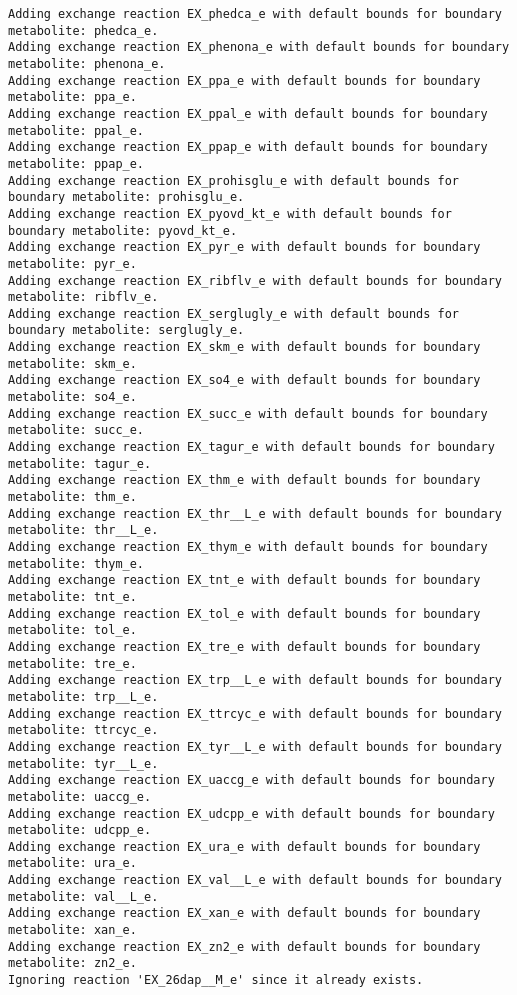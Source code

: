 \documentclass[
  letterpaper,
  DIV=11,
  numbers=noendperiod]{scrartcl}
\begin{document}
\begin{verbatim}
Adding exchange reaction EX_phedca_e with default bounds for boundary metabolite: phedca_e.
Adding exchange reaction EX_phenona_e with default bounds for boundary metabolite: phenona_e.
Adding exchange reaction EX_ppa_e with default bounds for boundary metabolite: ppa_e.
Adding exchange reaction EX_ppal_e with default bounds for boundary metabolite: ppal_e.
Adding exchange reaction EX_ppap_e with default bounds for boundary metabolite: ppap_e.
Adding exchange reaction EX_prohisglu_e with default bounds for boundary metabolite: prohisglu_e.
Adding exchange reaction EX_pyovd_kt_e with default bounds for boundary metabolite: pyovd_kt_e.
Adding exchange reaction EX_pyr_e with default bounds for boundary metabolite: pyr_e.
Adding exchange reaction EX_ribflv_e with default bounds for boundary metabolite: ribflv_e.
Adding exchange reaction EX_serglugly_e with default bounds for boundary metabolite: serglugly_e.
Adding exchange reaction EX_skm_e with default bounds for boundary metabolite: skm_e.
Adding exchange reaction EX_so4_e with default bounds for boundary metabolite: so4_e.
Adding exchange reaction EX_succ_e with default bounds for boundary metabolite: succ_e.
Adding exchange reaction EX_tagur_e with default bounds for boundary metabolite: tagur_e.
Adding exchange reaction EX_thm_e with default bounds for boundary metabolite: thm_e.
Adding exchange reaction EX_thr__L_e with default bounds for boundary metabolite: thr__L_e.
Adding exchange reaction EX_thym_e with default bounds for boundary metabolite: thym_e.
Adding exchange reaction EX_tnt_e with default bounds for boundary metabolite: tnt_e.
Adding exchange reaction EX_tol_e with default bounds for boundary metabolite: tol_e.
Adding exchange reaction EX_tre_e with default bounds for boundary metabolite: tre_e.
Adding exchange reaction EX_trp__L_e with default bounds for boundary metabolite: trp__L_e.
Adding exchange reaction EX_ttrcyc_e with default bounds for boundary metabolite: ttrcyc_e.
Adding exchange reaction EX_tyr__L_e with default bounds for boundary metabolite: tyr__L_e.
Adding exchange reaction EX_uaccg_e with default bounds for boundary metabolite: uaccg_e.
Adding exchange reaction EX_udcpp_e with default bounds for boundary metabolite: udcpp_e.
Adding exchange reaction EX_ura_e with default bounds for boundary metabolite: ura_e.
Adding exchange reaction EX_val__L_e with default bounds for boundary metabolite: val__L_e.
Adding exchange reaction EX_xan_e with default bounds for boundary metabolite: xan_e.
Adding exchange reaction EX_zn2_e with default bounds for boundary metabolite: zn2_e.
Ignoring reaction 'EX_26dap__M_e' since it already exists.

\end{verbatim}
\end{document}
